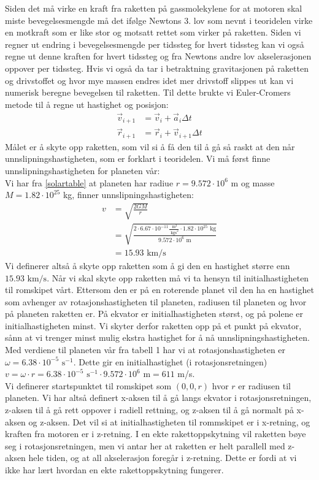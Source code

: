 \documentclass[reprint,english,notitlepage]{revtex4-1}
\begin{document}
	Siden det må virke en kraft fra raketten på gassmolekylene for at motoren skal miste
	bevegelsesmengde må det ifølge Newtons 3. lov som nevnt i teoridelen virke en motkraft
	som er like stor og motsatt rettet som virker på raketten. Siden vi regner ut endring
	i bevegelsesmengde per tidssteg for hvert tidssteg kan vi også regne ut denne
	kraften for hvert tidssteg og fra Newtons andre lov akselerasjonen oppover per
	tidssteg. Hvis vi også da tar i betraktning gravitasjonen på raketten og drivstoffet
	og hvor mye massen endres idet mer drivstoff slippes ut kan vi numerisk beregne
	bevegelsen til raketten. Til dette brukte vi Euler-Cromers
	metode til å regne ut hastighet og posisjon:
	\begin{align*}
		\vec{v}_{i+1} &= \vec{v}_i + \vec{a}_i\Delta t \\
		\vec{r}_{i+1} &= \vec{r}_i + \vec{v}_{i+1}\Delta t
	\end{align*}
	Målet er å skyte opp raketten, som vil si å få den til å gå så raskt at den når
	unnslipningshastigheten, som er forklart i teoridelen.
	Vi må først finne unnslipningshastigheten for planeten vår: \\
	Vi har fra \ref{solartable} at planeten har radiue $r = 9.572\cdot10^6$ m og
	masse $M = 1.82\cdot10^{25}$ kg, finner unnslipningshastigheten:
	\begin{align*}
		v &= \sqrt{\frac{2GM}{r}}\\
		&= \sqrt{\frac{2\cdot 6.67\cdot10^{-11}\frac{\text{ m}^3}{\text{ kgs}^2}\cdot1.82\cdot10^{25}\text{ kg}}{9.572\cdot10^6\text{ m}}}\\
		&= 15.93\text{ km/s}
	\end{align*}
	Vi definerer altså å skyte opp raketten som å gi den en hastighet større enn $15.93\text{ km/s}$.
	Når vi skal skyte opp raketten må vi ta hensyn til initialhastigheten til romskipet vårt. Ettersom den er
	på en roterende planet vil den ha en hastighet som avhenger av rotasjonshastigheten
	til planeten, radiusen til planeten og hvor på planeten raketten er. På ekvator
	er initialhastigheten størst, og på polene er initialhastigheten minst. Vi skyter
	derfor raketten opp på et punkt på ekvator, sånn at vi trenger minst mulig ekstra
	hastighet for å nå unnslipningshastigheten. Med verdiene til planeten vår fra
	tabell 1 har vi at rotasjonshastigheten er $\omega = 6.38\cdot10^{-5}\text{ s}^{-1}$.
	Dette gir en initialhastighet (i rotasjonsretningen) $v = \omega \cdot r=6.38\cdot 10^{-5}\text{ s}^{-1} \cdot9.572 \cdot 10^6\text{ m} = 611$ m/s. \\
	Vi definerer startspunktet til romskipet som $(0, 0, r)$ hvor $r$ er radiusen til
	planeten. Vi har altså definert x-aksen til å gå langs ekvator i rotasjonsretningen,
	z-aksen til å gå rett oppover i radiell rettning, og z-aksen til å gå normalt på
	x-aksen og z-aksen. Det vil si at initialhastigheten til rommskipet er i x-retning,
	og kraften fra motoren er i z-retning. I en ekte rakettoppskytning vil raketten
	bøye seg i rotasjonsretningen, men vi antar her at raketten er helt parallell med
	z-aksen hele tiden, og at all akselerasjon foregår i z-retning. Dette er fordi at
	vi ikke har lært hvordan en ekte rakettoppskytning fungerer.
\end{document}
